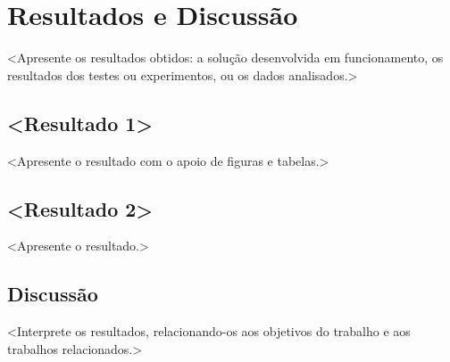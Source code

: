 \chapter[Resultados e Discussão]{Resultados e Discussão}\label{ch:resultados}

<Apresente os resultados obtidos: a solução desenvolvida em funcionamento,
os resultados dos testes ou experimentos, ou os dados analisados.>

\section{<Resultado 1>}\label{sec:resultado1}

<Apresente o resultado com o apoio de figuras e tabelas.>

\section{<Resultado 2>}\label{sec:resultado2}

<Apresente o resultado.>

\section{Discussão}\label{sec:discussao}

<Interprete os resultados, relacionando-os aos objetivos do trabalho e aos
trabalhos relacionados.>
